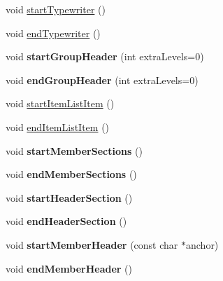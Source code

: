 \begin{DoxyCompactItemize}
\item 
void \hyperlink{class_output_list_a2e60bda5e249554e2fc264aa32d9d93e}{start\-Typewriter} ()
\item 
void \hyperlink{class_output_list_acb220673316232acd7d1050553dafaf6}{end\-Typewriter} ()
\item 
\hypertarget{class_output_list_a05d08c1406c9e84fe3e434b95258d6e5}{void {\bfseries start\-Group\-Header} (int extra\-Levels=0)}\label{class_output_list_a05d08c1406c9e84fe3e434b95258d6e5}

\item 
\hypertarget{class_output_list_ad5eb40fd96c56af8bc48c212af40d8a2}{void {\bfseries end\-Group\-Header} (int extra\-Levels=0)}\label{class_output_list_ad5eb40fd96c56af8bc48c212af40d8a2}

\item 
void \hyperlink{class_output_list_ab4ab0e8996b14723e45e955fe68f03bc}{start\-Item\-List\-Item} ()
\item 
void \hyperlink{class_output_list_a61efca8a19608566df04a45d16e88449}{end\-Item\-List\-Item} ()
\item 
\hypertarget{class_output_list_aa363f7f143f8451b0fd035e9856f1b87}{void {\bfseries start\-Member\-Sections} ()}\label{class_output_list_aa363f7f143f8451b0fd035e9856f1b87}

\item 
\hypertarget{class_output_list_a2f9645e00372366ad64476dbc66cd5ac}{void {\bfseries end\-Member\-Sections} ()}\label{class_output_list_a2f9645e00372366ad64476dbc66cd5ac}

\item 
\hypertarget{class_output_list_add9e7a492a43830dd3c77cd0e5c06884}{void {\bfseries start\-Header\-Section} ()}\label{class_output_list_add9e7a492a43830dd3c77cd0e5c06884}

\item 
\hypertarget{class_output_list_aeca202ed7306f7d9aa20f8e707d96301}{void {\bfseries end\-Header\-Section} ()}\label{class_output_list_aeca202ed7306f7d9aa20f8e707d96301}

\item 
\hypertarget{class_output_list_a76b6507db2808c715c537895bdb93b78}{void {\bfseries start\-Member\-Header} (const char $\ast$anchor)}\label{class_output_list_a76b6507db2808c715c537895bdb93b78}

\item 
\hypertarget{class_output_list_a618c1bfc8806d29116abac6b5817c137}{void {\bfseries end\-Member\-Header} ()}\label{class_output_list_a618c1bfc8806d29116abac6b5817c137}


\end{DoxyCompactItemize}
